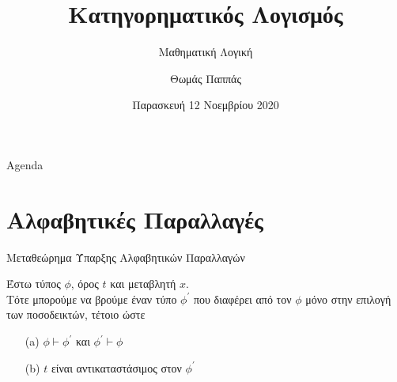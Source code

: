 \documentclass{beamer}
\begin{document}
\title{Κατηγορηματικός Λογισμός}
\subtitle{Μαθηματική Λογική}
\author{Θωμάς Παππάς}
\date{Παρασκευή 12 Νοεμβρίου 2020}
\maketitle

\begin{frame}{Agenda}
  \tableofcontents[hideallsubsections]
\end{frame}


\section{Αλφαβητικές Παραλλαγές}

\begin{frame}{Μεταθεώρημα Ύπαρξης Αλφαβητικών Παραλλαγών}
  \begin{block}{}
    Έστω τύπος $\phi$, όρος $t$ και μεταβλητή $x$.\\
    Τότε μπορούμε να βρούμε έναν τύπο $\phi^\prime$ που διαφέρει από τον $\phi$ μόνο στην επιλογή των ποσοδεικτών, τέτοιο ώστε
    \begin{itemize}
      \item[(a)] $\phi \vdash \phi^\prime$ και $\phi^\prime \vdash \phi$
      \item[(b)] $t$ είναι αντικαταστάσιμος στον $\phi^\prime$
    \end{itemize}
  \end{block}
\end{frame}
\end{document}
